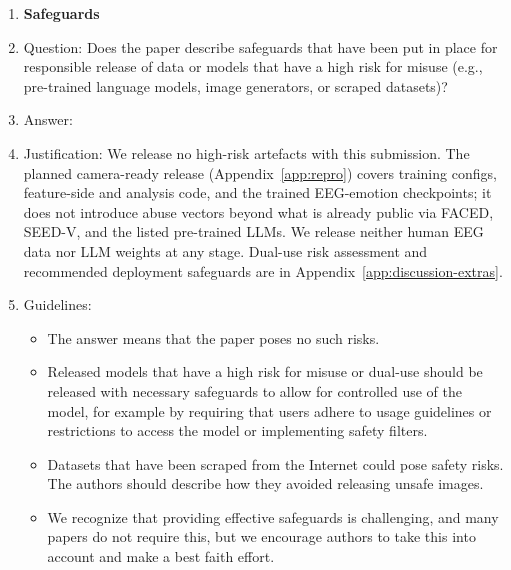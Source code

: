 \begin{enumerate}
\item {\bf Safeguards}
    \item[] Question: Does the paper describe safeguards that have been put in place for responsible release of data or models that have a high risk for misuse (e.g., pre-trained language models, image generators, or scraped datasets)?
    \item[] Answer: \answerNA{}
    \item[] Justification: We release no high-risk artefacts with this submission. The planned camera-ready release (Appendix~\ref{app:repro}) covers training configs, feature-side and analysis code, and the trained EEG-emotion checkpoints; it does not introduce abuse vectors beyond what is already public via FACED, SEED-V, and the listed pre-trained LLMs. We release neither human EEG data nor LLM weights at any stage. Dual-use risk assessment and recommended deployment safeguards are in Appendix~\ref{app:discussion-extras}.
    \item[] Guidelines:
    \begin{itemize}
        \item The answer \answerNA{} means that the paper poses no such risks.
        \item Released models that have a high risk for misuse or dual-use should be released with necessary safeguards to allow for controlled use of the model, for example by requiring that users adhere to usage guidelines or restrictions to access the model or implementing safety filters.
        \item Datasets that have been scraped from the Internet could pose safety risks. The authors should describe how they avoided releasing unsafe images.
        \item We recognize that providing effective safeguards is challenging, and many papers do not require this, but we encourage authors to take this into account and make a best faith effort.
    \end{itemize}


\end{enumerate}
